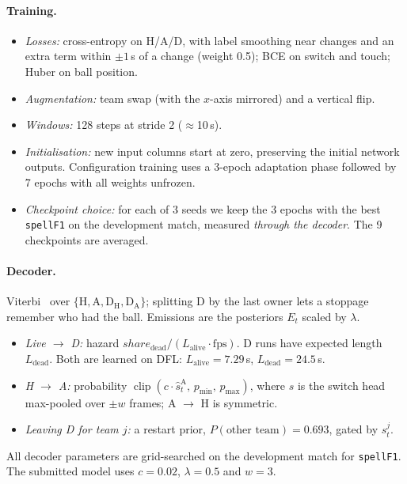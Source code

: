 \documentclass[10pt,a4paper,twocolumn]{article}
\newcommand{\spellF}{\texttt{spellF1}}
\begin{document}
\paragraph{Training.}
\begin{itemize}
  \item \emph{Losses:} cross-entropy on H/A/D, with label smoothing near changes and an extra term
        within $\pm1$\,s of a change (weight 0.5); BCE on switch and touch; Huber on ball position.
  \item \emph{Augmentation:} team swap (with the $x$-axis mirrored) and a vertical flip.
  \item \emph{Windows:} 128 steps at stride 2 ($\approx$10\,s).
  \item \emph{Initialisation:} new input columns start at zero, preserving the initial network
        outputs. Configuration training uses a 3-epoch adaptation phase followed by 7 epochs
        with all weights unfrozen.
  \item \emph{Checkpoint choice:} for each of 3 seeds we keep the 3 epochs with the best \spellF{}
        on the development match, measured \emph{through the decoder}. The 9 checkpoints are averaged.
\end{itemize}

\paragraph{Decoder.} Viterbi~\cite{rabiner1989} over $\{\mathrm H,\mathrm A,\mathrm D_{\mathrm H},\mathrm
D_{\mathrm A}\}$; splitting D by the last owner lets a stoppage remember who had the ball.
Emissions are the posteriors $E_t$ scaled by $\lambda$.
\begin{itemize}
  \item \emph{Live $\to$ D:} hazard $\mathit{share}_{\text{dead}}/(L_{\text{alive}}\cdot
        \text{fps})$. D runs have expected length $L_{\text{dead}}$. Both are learned on DFL:
        $L_{\text{alive}} = 7.29$\,s, $L_{\text{dead}} = 24.5$\,s.
  \item \emph{H $\to$ A:} probability $\operatorname{clip}(c\cdot\hat s_t^{\mathrm A},\,
        p_{\min},\, p_{\max})$, where $\hat s$ is the switch head max-pooled over $\pm w$ frames;
        A $\to$ H is symmetric.
  \item \emph{Leaving D for team $j$:} a restart prior, $P(\text{other team}) = 0.693$, gated by
        $s_t^{j}$.
\end{itemize}
All decoder parameters are grid-searched on the development match for \spellF. The submitted model uses
$c = 0.02$, $\lambda = 0.5$ and $w = 3$.
\end{document}
